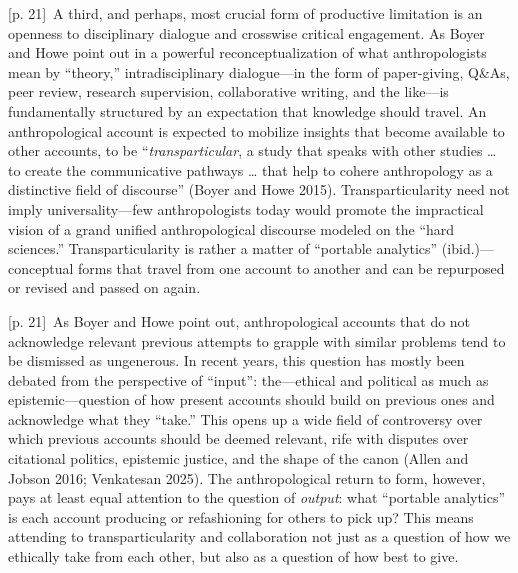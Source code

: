 \documentclass[10pt,a4paper]{article}
\begin{document}
{\scriptsize\color{gray} [p. 21]}\ A third, and perhaps, most crucial form of productive limitation is an openness to disciplinary dialogue and crosswise critical engagement. As Boyer and Howe point out in a powerful reconceptualization of what anthropologists mean by “theory,” intradisciplinary dialogue—in the form of paper-giving, Q\&As, peer review, research supervision, collaborative writing, and the like—is fundamentally structured by an expectation that knowledge should travel. An anthropological account is expected to mobilize insights that become available to other accounts, to be “\textit{transparticular}, a study that speaks with other studies … to create the communicative pathways … that help to cohere anthropology as a distinctive field of discourse” (Boyer and Howe 2015). Transparticularity need not imply universality—few anthropologists today would promote the impractical vision of a grand unified anthropological discourse modeled on the “hard sciences.” Transparticularity is rather a matter of “portable analytics” (ibid.)—conceptual forms that travel from one account to another and can be repurposed or revised and passed on again.\par
{\scriptsize\color{gray} [p. 21]}\ As Boyer and Howe point out, anthropological accounts that do not acknowledge relevant previous attempts to grapple with similar problems tend to be dismissed as ungenerous. In recent years, this question has mostly been debated from the perspective of “input”: the—ethical and political as much as epistemic—question of how present accounts should build on previous ones and acknowledge what they “take.” This opens up a wide field of controversy over which previous accounts should be deemed relevant, rife with disputes over citational politics, epistemic justice, and the shape of the canon (Allen and Jobson 2016; Venkatesan 2025). The anthropological return to form, however, pays at least equal attention to the question of \textit{output}: what “portable analytics” is each account producing or refashioning for others to pick up? This means attending to transparticularity and collaboration not just as a question of how we ethically take from each other, but also as a question of how best to give.\par
\end{document}
